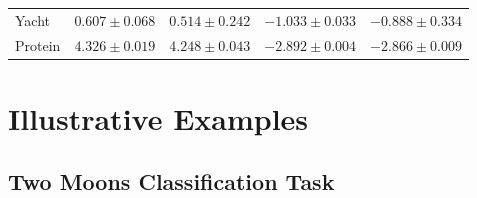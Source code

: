 \begin{appendices}
\begin{table}[htb!]
\begin{tabular}{lllll}
Yacht    & $0.607 \pm 0.068$                    & \cellcolor[gray]{0.9} $\mathbf{0.514 \pm 0.242}$              & $-1.033 \pm 0.033$                   & \cellcolor[gray]{0.9} $\mathbf{-0.888 \pm 0.334}$             \\
Protein  & $4.326 \pm 0.019$                    & \cellcolor[gray]{0.9} $\mathbf{4.248 \pm 0.043}$              & $-2.892 \pm 0.004$                   & \cellcolor[gray]{0.9} $\mathbf{-2.866 \pm 0.009}$             \\
\midrule
\midrule
\end{tabular}
\vspace*{-20pt}
\end{table}



\clearpage



%


\section{Illustrative Examples}
\label{appsec:illustrative_examples}

%
\subsection{Two Moons Classification Task}


\end{appendices}
